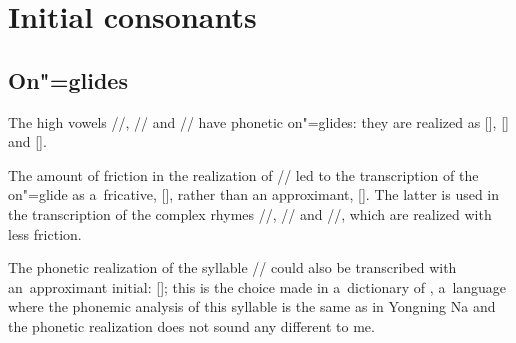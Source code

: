 			\section{Initial consonants}
			\label{sec:consonants}

			\subsection{On"=glides}
			\label{sec:smoothphoneticonsets}
			\label{sec:apresentationofonglideswithahypothesisaboutadiachroniconsetofhardeningofinitialglides}
			
			The high vowels //, // and // have phonetic on"=glides: they are realized as
			[{\kern1.3pt}], [] and []. 
			
			The amount of friction in the realization of // led to the transcription of the on"=glide as a~fricative, [{\kern1.3pt}], rather than an approximant, []. The latter is used in the transcription of the complex rhymes //, // and //, which are realized with less friction.
			
			The phonetic realization of the syllable // could also
			be transcribed with an~approximant initial: []; this is the choice made in a~dictionary of
			 \citep{pinsonetal2012}, a~language where the phonemic analysis of this syllable is the same as in Yongning Na and the phonetic
			realization does not sound any different to me.
			
